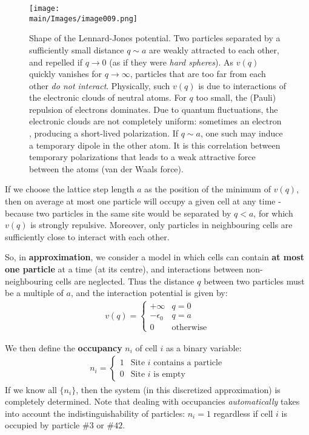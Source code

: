 \documentclass[../../main.tex]{subfiles}
\begin{document}
\begin{figure}[H]
    \centering
    \texttt{[image: \\main/Images/image009.png]}
    \caption{Shape of the Lennard-Jones potential. Two particles separated by a sufficiently small distance $q \sim a$ are weakly attracted to each other, and repelled if $q \to 0$ (as if they were \textit{hard spheres}). As $v(q)$ quickly vanishes for $q \to \infty$, particles that are too far from each other \textit{do not interact}. Physically, such $v(q)$ is due to interactions of the electronic clouds of neutral atoms. For $q$ too small, the (Pauli) repulsion of electrons dominates. Due to quantum fluctuations, the electronic clouds are not completely uniform: sometimes an electron , producing a short-lived polarization. If $q \sim a$, one such  may induce a temporary dipole in the other atom. It is this correlation between temporary polarizations that leads to a weak attractive force between the atoms (van der Waals force). \label{fig:lg-potential}}
\end{figure}

If we choose the lattice step length $a$ as the position of the minimum of $v(q)$, then on average at most one particle will occupy a given cell at any time - because two particles in the same site would be separated by $q < a$, for which $v(q)$ is strongly repulsive. Moreover, only particles in neighbouring cells are sufficiently close to interact with each other.

\medskip

So, in \textbf{approximation}, we consider a model in which cells can contain \textbf{at most one particle} at a time (at its centre), and interactions between non-neighbouring cells are neglected. Thus the distance $q$ between two particles must be a multiple of $a$, and the interaction potential is given by:
\begin{align*}
    v(q) = \begin{cases}
        +\infty & q = 0\\
        -\epsilon_0 & q=a\\
        0 & \text{otherwise}
    \end{cases}
\end{align*}

We then define the \textbf{occupancy} $n_i$ of cell $i$ as a binary variable:
\begin{align*}
    n_i = \begin{cases}
        1 & \text{Site $i$ contains a particle}\\
        0 & \text{Site $i$ is empty}
    \end{cases}
\end{align*} 
If we know all $\{n_i\}$, then the system (in this discretized approximation) is completely determined. Note that dealing with occupancies \textit{automatically} takes into account the indistinguishability of particles: $n_i = 1$ regardless if cell $i$ is occupied by particle $\#3$ or $\#42$.
\end{document}
